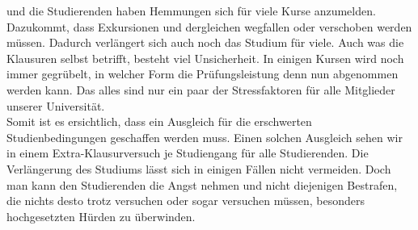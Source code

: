 {            und die Studierenden haben Hemmungen sich für viele Kurse anzumelden. Dazukommt, dass
            Exkursionen und dergleichen wegfallen oder verschoben werden müssen. Dadurch verlängert sich
            auch noch das Studium für viele. Auch was die Klausuren selbst betrifft, besteht viel Unsicherheit.
            In einigen Kursen wird noch immer gegrübelt, in welcher Form die Prüfungsleistung denn nun
            abgenommen werden kann. Das alles sind nur ein paar der Stressfaktoren für alle Mitglieder unserer
            Universität.\\
            Somit ist es ersichtlich, dass ein Ausgleich für die erschwerten Studienbedingungen geschaffen
            werden muss. Einen solchen Ausgleich sehen wir in einem Extra-Klausurversuch je Studiengang für
            alle Studierenden. Die Verlängerung des Studiums lässt sich in einigen Fällen nicht vermeiden.
            Doch man kann den Studierenden die Angst nehmen und nicht diejenigen Bestrafen, die nichts
            desto trotz versuchen oder sogar versuchen müssen, besonders hochgesetzten Hürden zu
            überwinden.
        }{

        }{
        }
